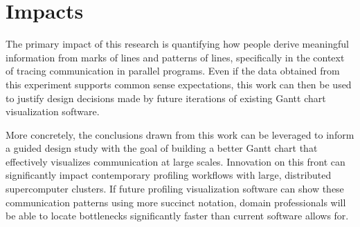 \section{Impacts}
\label{sec:impact}

The primary impact of this research is quantifying how people derive meaningful information from marks of lines and patterns of lines, specifically in the context of tracing communication in parallel programs. Even if the data obtained from this experiment supports common sense expectations, this work can then be used to justify design decisions made by future iterations of existing Gantt chart visualization software.

More concretely, the conclusions drawn from this work can be leveraged to inform a guided design study with the goal of building a better Gantt chart that effectively visualizes communication at large scales. Innovation on this front can significantly impact contemporary profiling workflows with large, distributed supercomputer clusters. If future profiling visualization software can show these communication patterns using more succinct notation, domain professionals will be able to locate bottlenecks significantly faster than current software allows for.

